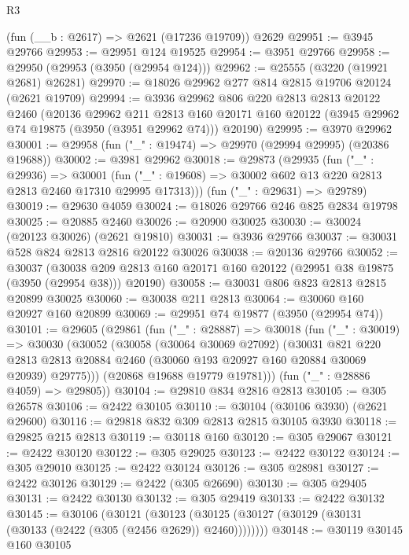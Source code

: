 \begin{lexlean}{R3}
\begin{coremodule}
    (fun (__b : @2617) => @2621 (@17236 @19709))
    @2629
@29951 := @3945 @29766
@29953 := @29951 @124 @19525
@29954 := @3951 @29766
@29958 := @29950 (@29953 (@3950 (@29954 @124)))
@29962 := @25555 (@3220 (@19921 @2681) @26281)
@29970 := @18026 @29962 @277 @814 @2815 @19706 @20124 (@2621 @19709)
@29994 := @3936
    @29962
    @806
    @220
    @2813
    @2813
    @20122
    @2460
    (@20136
      @29962
      @211
      @2813
      @160
      @20171
      @160
      @20122
      (@3945 @29962 @74 @19875 (@3950 (@3951 @29962 @74)))
      @20190)
@29995 := @3970 @29962
@30001 := @29958 (fun ("_" : @19474) => @29970 (@29994 @29995) (@20386 @19688))
@30002 := @3981 @29962
@30018 := @29873
    (@29935
      (fun ("_" : @29936) =>
      @30001 (fun ("_" : @19608) => @30002 @602 @13 @220 @2813 @2813 @2460 @17310 @29995 @17313)))
    (fun ("_" : @29631) => @29789)
@30019 := @29630 @4059
@30024 := @18026 @29766 @246 @825 @2834 @19798
@30025 := @20885 @2460
@30026 := @20900 @30025
@30030 := @30024 (@20123 @30026) (@2621 @19810)
@30031 := @3936 @29766
@30037 := @30031 @528 @824 @2813 @2816 @20122 @30026
@30038 := @20136 @29766
@30052 := @30037
    (@30038 @209 @2813 @160 @20171 @160 @20122 (@29951 @38 @19875 (@3950 (@29954 @38))) @20190)
@30058 := @30031 @806 @823 @2813 @2815 @20899 @30025
@30060 := @30038 @211 @2813
@30064 := @30060 @160 @20927 @160 @20899
@30069 := @29951 @74 @19877 (@3950 (@29954 @74))
@30101 := @29605
    (@29861
      (fun ("_" : @28887) =>
      @30018
        (fun ("_" : @30019) =>
        @30030
          (@30052
            (@30058
              (@30064 @30069 @27092)
              (@30031
                @821
                @220
                @2813
                @2813
                @20884
                @2460
                (@30060 @193 @20927 @160 @20884 @30069 @20939)
                @29775)))
          (@20868 @19688 @19779 @19781)))
      (fun ("_" : @28886 @4059) => @29805))
@30104 := @29810 @834 @2816 @2813
@30105 := @305 @26578
@30106 := @2422 @30105
@30110 := @30104 (@30106 @3930) (@2621 @29600)
@30116 := @29818 @832 @309 @2813 @2815 @30105 @3930
@30118 := @29825 @215 @2813
@30119 := @30118 @160
@30120 := @305 @29067
@30121 := @2422 @30120
@30122 := @305 @29025
@30123 := @2422 @30122
@30124 := @305 @29010
@30125 := @2422 @30124
@30126 := @305 @28981
@30127 := @2422 @30126
@30129 := @2422 (@305 @26690)
@30130 := @305 @29405
@30131 := @2422 @30130
@30132 := @305 @29419
@30133 := @2422 @30132
@30145 := @30106
    (@30121
      (@30123 (@30125 (@30127 (@30129 (@30131 (@30133 (@2422 (@305 (@2456 @2629)) @2460))))))))
@30148 := @30119 @30145 @160 @30105

\end{coremodule}
\end{lexlean}
